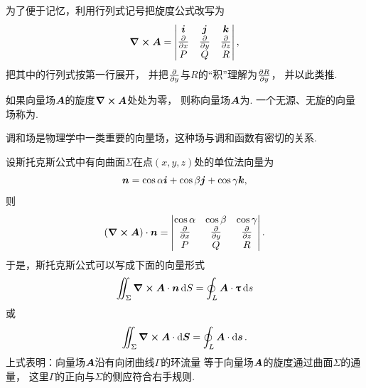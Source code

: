 为了便于记忆，利用行列式记号把旋度公式改写为\begin{equation*}
	\curl{\boldsymbol{A}}
	= \begin{vmatrix}
		\boldsymbol{i} & \boldsymbol{j} & \boldsymbol{k} \\
		\pdv{x} & \pdv{y} & \pdv{z} \\
		P & Q & R
	\end{vmatrix},
\end{equation*}
把其中的行列式按第一行展开，
并把\(\pdv{y}\)与\(R\)的“积”理解为\(\pdv{R}{y}\)，
并以此类推.

\begin{definition}
如果向量场\(\boldsymbol{A}\)的旋度\(\curl{\boldsymbol{A}}\)处处为零，
则称向量场\(\boldsymbol{A}\)为.
一个无源、无旋的向量场称为.
\end{definition}
调和场是物理学中一类重要的向量场，这种场与调和函数有密切的关系.

设斯托克斯公式中有向曲面\(\Sigma\)在点\((x,y,z)\)处的单位法向量为\begin{equation*}
	\boldsymbol{n} = \cos\alpha \boldsymbol{i} + \cos\beta \boldsymbol{j} + \cos\gamma \boldsymbol{k},
\end{equation*}
则\begin{equation*}
	(\curl{\boldsymbol{A}})\cdot\boldsymbol{n}
	= \begin{vmatrix}
		\cos\alpha & \cos\beta & \cos\gamma \\
		\pdv{x} & \pdv{y} & \pdv{z} \\
		P & Q & R
	\end{vmatrix}.
\end{equation*}
于是，斯托克斯公式可以写成下面的向量形式\begin{equation*}
	\iint_\Sigma \curl{\boldsymbol{A}}\cdot\boldsymbol{n} \dd{S}
	= \oint_L \boldsymbol{A}\cdot\boldsymbol{\uptau} \dd{s}
\end{equation*}或\begin{equation*}
	\iint_\Sigma \curl{\boldsymbol{A}}\cdot\dd{\boldsymbol{S}}
	= \oint_L \boldsymbol{A}\cdot\dd{\boldsymbol{s}}.
\end{equation*}
上式表明：向量场\(\boldsymbol{A}\)沿有向闭曲线\(\Gamma\)的环流量
等于向量场\(\boldsymbol{A}\)的旋度通过曲面\(\Sigma\)的通量，
这里\(\Gamma\)的正向与\(\Sigma\)的侧应符合右手规则.

